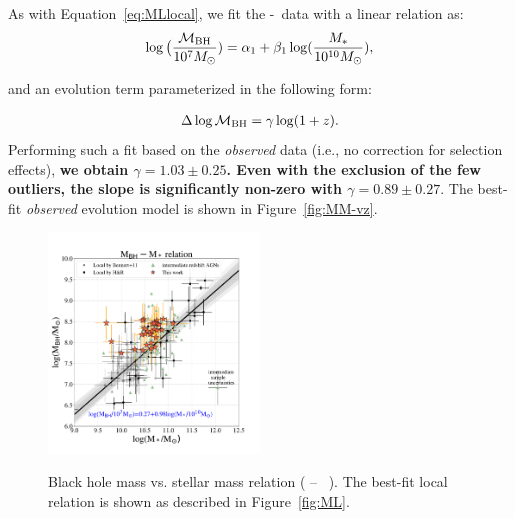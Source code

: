 \documentclass[apj]{emulateapj}
\begin{document}
As with Equation~\ref{eq:MLlocal}, we fit the \mbh-\smass\ data with a linear relation as:
\begin{eqnarray}
\label{eq:MMlocal}
\log \big( \frac{\mathcal M_{\rm BH}}{10^{7}M_{\odot}})= \alpha_1 + \beta_1 \log(\frac{M_*}{10^{10}M_{\odot}}),
\end {eqnarray}

\noindent and an evolution term parameterized in the following form:

\begin{eqnarray}
\label{eq:offset}
\Delta \log \mathcal M_{\rm BH}= \gamma \log (1 + z).
\end{eqnarray} 
Performing such a fit based on the {\it observed} data (i.e., no correction for selection effects), {\bf we obtain $\gamma  = 1.03 \pm 0.25$. Even with the exclusion of the few outliers, the slope is significantly non-zero with $\gamma  = 0.89 \pm 0.27$}. The best-fit {\it observed} evolution model is shown in Figure~\ref{fig:MM-vz}.

\begin{figure}
\centering
{
\includegraphics[width=0.5\textwidth]{fig/MBH-Mstar.pdf}
}
\caption{\label{fig:MM} 
Black hole mass vs. stellar mass relation ( \mbh -- \smass\ ). The best-fit local relation is shown as described in Figure~\ref{fig:ML}.
}
\end{figure} 
\end{document}

